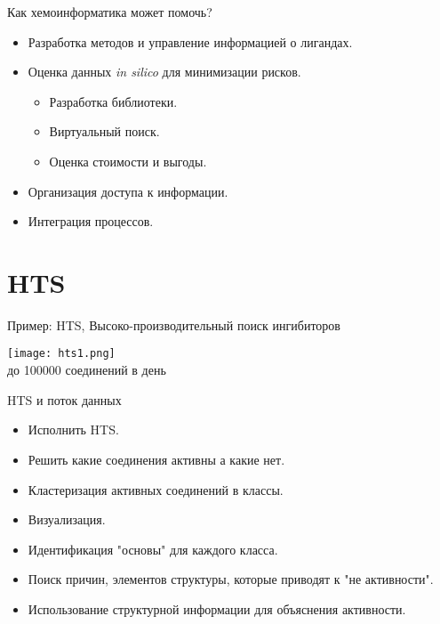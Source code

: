 \begin{frame}{Как хемоинформатика может помочь?}
    \begin{itemize}
        \item Разработка методов и управление информацией о лигандах.
        \item Оценка данных \textit{in silico} для минимизации рисков.
            \begin{itemize}
                \item Разработка библиотеки.
                \item Виртуальный поиск.
                \item Оценка стоимости и выгоды.
            \end{itemize}
        \item Организация доступа к информации.
        \item Интеграция процессов.
    \end{itemize}
\end{frame}

\section{HTS}
\begin{frame}{Пример: HTS, Высоко-производительный поиск ингибиторов}
	\begin{center}
	\texttt{[image: hts1.png]} 
\\
    до 100000 соединений в день
	\end{center}

\end{frame}

\begin{frame}{HTS и поток данных}
    \begin{itemize}
        \item Исполнить HTS.
        \item Решить какие соединения активны а какие нет.    
        \item Кластеризация активных  соединений в классы.
        \item Визуализация.
        \item Идентификация "основы" для каждого класса.
        \item Поиск причин, элементов структуры, которые приводят к "не активности".
        \item Использование структурной информации для объяснения активности.
    \end{itemize}
\end{frame}


